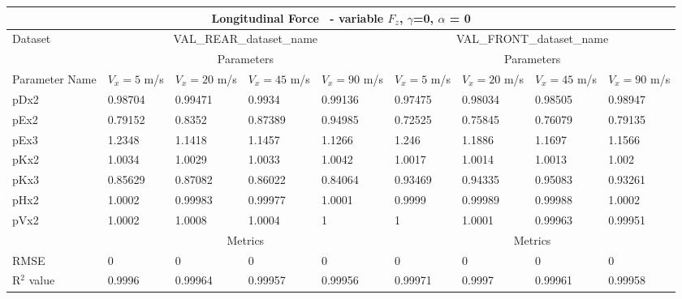         \begin{tabular}{lllll|llll} \hline \multicolumn{9}{c}{Longitudinal Force~ - variable $F_z$, $\gamma$=0, $\alpha$ = 0}                                                                                                                                                                   \\ \hline Dataset                         & \multicolumn{4}{c|}{VAL\_REAR\_dataset\_name}                                                & \multicolumn{4}{c}{VAL\_FRONT\_dataset\_name}                                                     \\ \hline \multicolumn{1}{c}{}            & \multicolumn{4}{c|}{Parameters}                                                              & \multicolumn{4}{c}{Parameters}                                                                    \\ \hline Parameter Name                  & $V_x = 5$ m/s     & $V_x = 20$ m/s     & $V_x = 45$ m/s     & $V_x = 90$ m/s     & $V_x = 5$ m/s      & $V_x = 20$ m/s      & $V_x = 45$ m/s      & $V_x = 90$ m/s       \\ pDx2                            & 0.98704 & 0.99471 & 0.9934 & 0.99136 & 0.97475 & 0.98034 & 0.98505 & 0.98947  \\ pEx2                            & 0.79152 & 0.8352 & 0.87389 & 0.94985 & 0.72525 & 0.75845 & 0.76079 & 0.79135  \\ pEx3                            & 1.2348 & 1.1418 & 1.1457 & 1.1266 & 1.246 & 1.1886 & 1.1697 & 1.1566  \\ pKx2                            & 1.0034 & 1.0029 & 1.0033 & 1.0042 & 1.0017 & 1.0014 & 1.0013 & 1.002  \\ pKx3                            & 0.85629 & 0.87082 & 0.86022 & 0.84064 & 0.93469 & 0.94335 & 0.95083 & 0.93261  \\ pHx2                            & 1.0002 & 0.99983 & 0.99977 & 1.0001 & 0.9999 & 0.99989 & 0.99988 & 1.0002  \\ pVx2                            & 1.0002 & 1.0008 & 1.0004 & 1 & 1 & 1.0001 & 0.99963 & 0.99951  \\ \hline \multicolumn{1}{c|}{}           & \multicolumn{4}{c|}{Metrics}                                                                 & \multicolumn{4}{c}{Metrics}                                                                       \\ \hline RMSE                            & 0 & 0 & 0 & 0 & 0 & 0 & 0 & 0  \\ R$^2$ value                       & 0.9996   & 0.99964   & 0.99957   & 0.99956   & 0.99971   & 0.9997   & 0.99961   & 0.99958    \\ \hline \end{tabular} 